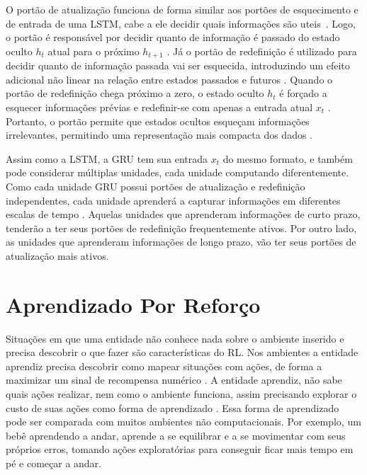 %

O portão de atualização funciona de forma similar aos portões de esquecimento e de entrada de uma \acrshort{LSTM}, cabe a ele decidir quais informações são uteis~\cite{deep_learning}. Logo, o portão é responsável por decidir quanto de informação é passado do estado oculto $h_t$ atual para o próximo $h_{t+1}$ \cite{gru}. Já o portão de redefinição é utilizado para decidir quanto de informação passada vai ser esquecida, introduzindo um efeito adicional não linear na relação entre estados passados e futuros \cite{deep_learning}. Quando o portão de redefinição chega próximo a zero, o estado oculto $h_t$ é forçado a esquecer informações prévias e redefinir-se com apenas a entrada atual $x_t$ \cite{gru}. Portanto, o portão permite que estados ocultos esqueçam informações irrelevantes, permitindo uma representação mais compacta dos dados \cite{gru}.

Assim como a \acrshort{LSTM}, a \acrshort{GRU} tem sua entrada $x_t$ do mesmo formato, e também pode considerar múltiplas unidades, cada unidade computando diferentemente. Como cada unidade \acrshort{GRU} possui portões de atualização e redefinição independentes, cada unidade aprenderá a capturar informações em diferentes escalas de tempo \cite{gru}. Aquelas unidades que aprenderam informações de curto prazo, tenderão a ter seus portões de redefinição frequentemente ativos. Por outro lado, as unidades que aprenderam informações de longo prazo, vão ter seus portões de atualização mais ativos. 


\section{Aprendizado Por Reforço}
\label{sec:rl}

Situações em que uma entidade não conhece nada sobre o ambiente inserido e precisa descobrir o que fazer são características do \acrfull{RL}. Nos ambientes a entidade aprendiz precisa descobrir como mapear situações com ações, de forma a maximizar um sinal de recompensa numérico \cite{rl_intro}. A entidade aprendiz, não sabe quais ações realizar, nem como o ambiente funciona, assim precisando explorar o custo de suas ações como forma de aprendizado \cite{modern_approach}. Essa forma de aprendizado pode ser comparada com muitos ambientes não computacionais. Por exemplo, um bebê aprendendo a andar, aprende a se equilibrar e a se movimentar com seus próprios erros, tomando ações exploratórias para conseguir ficar mais tempo em pé e começar a andar.

